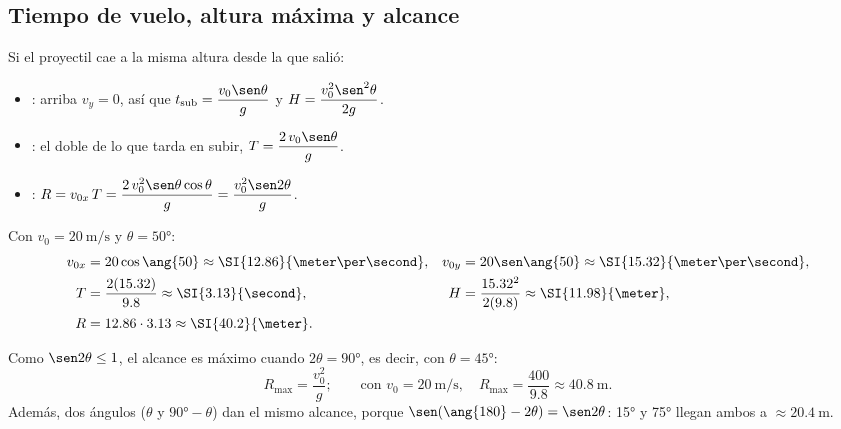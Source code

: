 \documentclass[11pt,a4paper]{article}
\begin{document}
\subsection{Tiempo de vuelo, altura máxima y alcance}
Si el proyectil cae a la misma altura desde la que salió:
\begin{itemize}
\item {}: arriba $v_y=0$, así que $t_{\text{sub}}=\dfrac{v_0\sen\theta}{g}$ y
      $H=\dfrac{v_0^{2}\sen^{2}\theta}{2g}$.
\item {}: el doble de lo que tarda en subir, $T=\dfrac{2\,v_0\sen\theta}{g}$.
\item {}: $R=v_{0x}\,T=\dfrac{2\,v_0^{2}\sen\theta\cos\theta}{g}=\dfrac{v_0^{2}\sen 2\theta}{g}$.
\end{itemize}
\begin{ejemplo}
Con $v_0=\SI{20}{\meter\per\second}$ y $\theta=\ang{50}$:
\begin{align*}
v_{0x}&=20\cos\ang{50}\approx\SI{12.86}{\meter\per\second}, & v_{0y}&=20\sen\ang{50}\approx\SI{15.32}{\meter\per\second},\\
T&=\frac{2(15.32)}{9.8}\approx\SI{3.13}{\second}, & H&=\frac{15.32^{2}}{2(9.8)}\approx\SI{11.98}{\meter},\\
R&=12.86\cdot3.13\approx\SI{40.2}{\meter}. & &
\end{align*}
\end{ejemplo}
\begin{propiedad}
Como $\sen 2\theta\le 1$, el alcance es máximo cuando $2\theta=\ang{90}$, es decir, con $\theta=\ang{45}$:
\[ R_{\max}=\frac{v_0^{2}}{g};\qquad\text{con } v_0=\SI{20}{\meter\per\second},\quad R_{\max}=\frac{400}{9.8}\approx\SI{40.8}{\meter}. \]
Además, dos ángulos  ($\theta$ y $\ang{90}-\theta$) dan el mismo alcance, porque
$\sen(\ang{180}-2\theta)=\sen 2\theta$: \ang{15} y \ang{75} llegan ambos a $\approx\SI{20.4}{\meter}$.
\end{propiedad}
\end{document}

